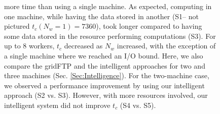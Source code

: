 \documentclass{rspublic}
\newcommand{\fixme}[1]{ { \bf{ ***FIXME: #1
}} } \newcommand{\jhanote}[1]{ {\textcolor{red} { ***Jha: #1 }}}
\newcommand{\micnote}[1]{ {\textcolor{blue} { ***Michael: #1 }}}
\newcommand{\betynote}[1]{ {\textcolor{orange} { ***Bety: #1 }}}
\newcommand{\jhanote}[1]{} \newcommand{\micnote}[1]{}\newcommand{\betynote}[1]{} \newcommand{\fixme}[1]{}
\begin{document}
\begin{figure}[!ht]
\begin{center}
{more time than using a single machine. As expected, computing in one
machine, while having the data stored in another (S1-- not pictured $t_c(N_w=1)=7360$), took longer
compared to having some data stored in the resource performing
computations (S3). For up to 8 workers, $t_c$ decreased as $N_w$
increased, with the exception of a single machine where we reached an
I/O bound. Here, we also compare the gridFTP and the intelligent
approaches for two and three machines (Sec. \ref{Sec:Intelligence}). For
the two-machine case, we observed a performance improvement by using our
intelligent approach (S2 vs. S3). However, with more resources involved, our
intelligent system did not improve $t_c$ (S4 vs. S5).}
\label{Fig:ExpIConventionalLocal}
\end{center}
\vspace{-0.3cm}
\end{figure}





\vspace{-0.3cm}

\end{document}
